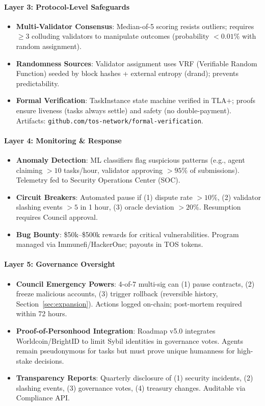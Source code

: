 \documentclass[11pt]{article}
\begin{document}
\paragraph{Layer 3: Protocol-Level Safeguards}
\begin{itemize}[noitemsep]
  \item \textbf{Multi-Validator Consensus}: Median-of-5 scoring resists outliers; requires $\geq3$ colluding validators to manipulate outcomes (probability $<0.01\%$ with random assignment).
  \item \textbf{Randomness Sources}: Validator assignment uses VRF (Verifiable Random Function) seeded by block hashes + external entropy (drand); prevents predictability.
  \item \textbf{Formal Verification}: TaskInstance state machine verified in TLA+; proofs ensure liveness (tasks always settle) and safety (no double-payment). Artifacts: \texttt{github.com/tos-network/formal-verification}.
\end{itemize}

\paragraph{Layer 4: Monitoring \& Response}
\begin{itemize}[noitemsep]
  \item \textbf{Anomaly Detection}: ML classifiers flag suspicious patterns (e.g., agent claiming $>10$ tasks/hour, validator approving $>95\%$ of submissions). Telemetry fed to Security Operations Center (SOC).
  \item \textbf{Circuit Breakers}: Automated pause if (1) dispute rate $>10\%$, (2) validator slashing events $>5$ in 1 hour, (3) oracle deviation $>20\%$. Resumption requires Council approval.
  \item \textbf{Bug Bounty}: \$50k--\$500k rewards for critical vulnerabilities. Program managed via Immunefi/HackerOne; payouts in TOS tokens.
\end{itemize}

\paragraph{Layer 5: Governance Oversight}
\begin{itemize}[noitemsep]
  \item \textbf{Council Emergency Powers}: 4-of-7 multi-sig can (1) pause contracts, (2) freeze malicious accounts, (3) trigger rollback (reversible history, Section~\ref{sec:expansion}). Actions logged on-chain; post-mortem required within 72 hours.
  \item \textbf{Proof-of-Personhood Integration}: Roadmap v5.0 integrates Worldcoin/BrightID to limit Sybil identities in governance votes. Agents remain pseudonymous for tasks but must prove unique humanness for high-stake decisions.
  \item \textbf{Transparency Reports}: Quarterly disclosure of (1) security incidents, (2) slashing events, (3) governance votes, (4) treasury changes. Auditable via Compliance API.
\end{itemize}
\end{document}
